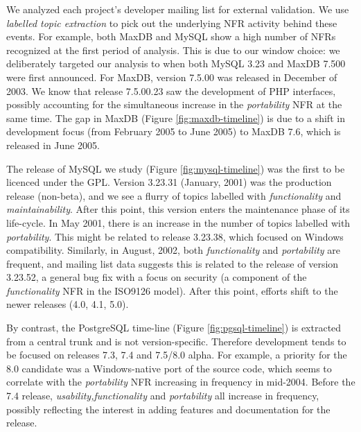 \documentclass[smallextended]{svjour3}       %
\begin{document}

We analyzed each project's developer mailing list for external validation. 
We use \textit{labelled topic extraction} to pick out the underlying NFR activity behind these events. 
For example, both MaxDB and MySQL show a high number of NFRs recognized at the first period of analysis. 
This is due to our window choice: we deliberately targeted our
analysis to when both MySQL 3.23
and MaxDB 7.500 were first announced. For MaxDB, version 7.5.00  was released in December of 2003. 
We know that release 7.5.00.23 saw the development of PHP interfaces, possibly accounting for the simultaneous increase in the \emph{portability}
NFR at the same time.
The gap in MaxDB (Figure \ref{fig:maxdb-timeline}) is due to a shift in development focus (from February 2005 to June 2005) to MaxDB 7.6, which is
released in June 2005.

The release of MySQL we study  (Figure \ref{fig:mysql-timeline}) was the first to be licenced under the GPL. 
Version 3.23.31 (January, 2001) was the production release (non-beta), and we see a flurry of topics labelled with \emph{functionality} and
\emph{maintainability}. 
After this point, this version enters the maintenance phase of its life-cycle. 
In May 2001, there is an increase in the number of topics labelled with \emph{portability}. 
This might be related to release 3.23.38, which focused on Windows compatibility. 
Similarly, in August, 2002, both \emph{functionality} and \emph{portability} are frequent, and mailing list data suggests this is related to the release
of version 3.23.52, a general bug fix with a focus on security (a component of the \emph{functionality} NFR in the ISO9126 model). 
After this point, efforts shift to the newer releases (4.0, 4.1,
5.0). 

By contrast, the PostgreSQL time-line  (Figure \ref{fig:pgsql-timeline}) is extracted from a central trunk and is not version-specific. Therefore development 
tends to be focused on releases 7.3, 7.4 and 7.5/8.0 alpha. For example, a priority for the 8.0 candidate was a Windows-native port of the source code, which seems to 
correlate with the \emph{portability} NFR increasing in frequency in mid-2004. Before the 7.4 release, \emph{usability,functionality} and \emph{portability} all 
increase in frequency, possibly reflecting the interest in adding features and documentation for the release.
\end{document}
